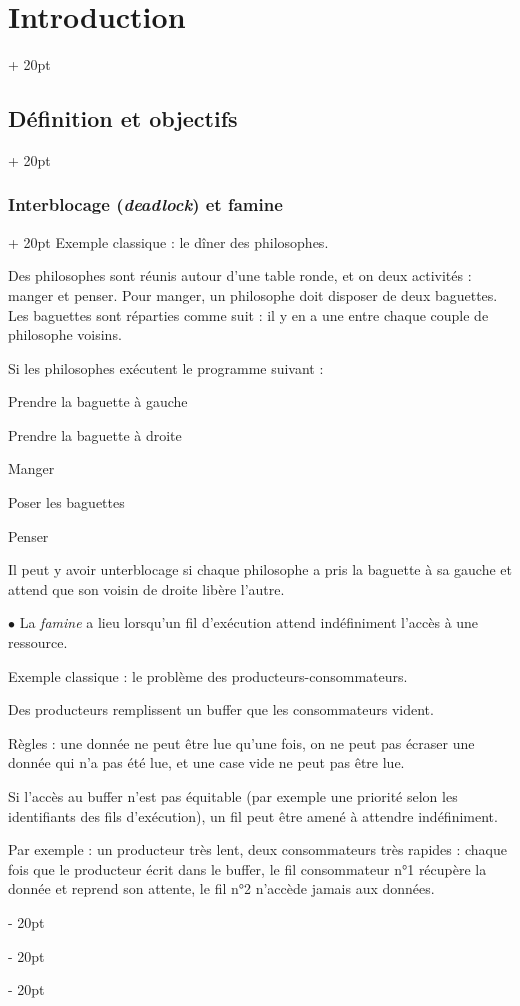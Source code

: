 \documentclass[a4paper, 12pt, twoside]{article}
\newcommand{\ind}[1][20pt]{\advance\leftskip + #1}
\newcommand{\deind}[1][20pt]{\advance\leftskip - #1}
\newenvironment{indt}[2][20pt]{#2 \par \ind[#1]}{\par \deind} %
\begin{document}
\begin{indt}{\section{Introduction}}
\begin{indt}{\subsection{Définition et objectifs}}
\begin{indt}{\subsubsection{Interblocage (\textit{deadlock}) et famine}}
                Exemple classique : le dîner des philosophes.

                Des philosophes sont réunis autour d'une table ronde, et on deux activités : manger et penser.
                Pour manger, un philosophe doit disposer de deux baguettes.
                Les baguettes sont réparties comme suit : il y en a une entre chaque couple de philosophe voisins.

                Si les philosophes exécutent le programme suivant :

                \begin{emphBox}
                    Prendre la baguette à gauche

                    Prendre la baguette à droite

                    Manger

                    Poser les baguettes

                    Penser
                \end{emphBox}

                Il peut y avoir unterblocage si chaque philosophe a pris la baguette à sa gauche et attend que son voisin de droite libère l'autre.

                \vspace{6pt}
                
                $\bullet$ La \textit{famine} a lieu lorsqu'un fil d'exécution attend indéfiniment l'accès à une ressource.

                Exemple classique : le problème des producteurs-consommateurs.

                Des producteurs remplissent un buffer que les consommateurs vident.

                Règles : une donnée ne peut être lue qu'une fois, on ne peut pas écraser une donnée qui n'a pas été lue, et une case vide ne peut pas être lue.

                Si l'accès au buffer n'est pas équitable (par exemple une priorité selon les identifiants des fils d'exécution), un fil peut être amené à attendre indéfiniment.

                Par exemple : un producteur très lent, deux consommateurs très rapides : chaque fois que le producteur écrit dans le buffer, le fil consommateur n°1 récupère la donnée et reprend son attente, le fil n°2 n'accède jamais aux données.
            \end{indt}

            \vspace{12pt}
            

\end{indt}
\end{indt}
\end{document}
